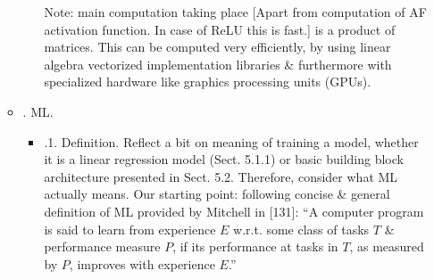 \documentclass{article}
\begin{document}
\begin{itemize}
\begin{itemize}
\begin{itemize}
			Note: main computation taking place [Apart from computation of AF activation function. In case of ReLU this is fast.] is a product of matrices. This can be computed very efficiently, by using linear algebra vectorized implementation libraries \& furthermore with specialized hardware like graphics processing units (GPUs).
		\end{itemize}
		\item {. ML.}
		\begin{itemize}
			\item {.1. Definition.} Reflect a bit on meaning of training a model, whether it is a linear regression model (Sect. 5.1.1) or basic building block architecture presented in Sect. 5.2. Therefore, consider what ML actually means. Our starting point: following concise \& general definition of ML provided by {\sc Mitchell} in [131]: ``A computer program is said to learn from experience $E$ w.r.t. some class of tasks $T$ \& performance measure $P$, if its performance at tasks in $T$, as measured by $P$, improves with experience $E$.''


\end{itemize}
\end{itemize}
\end{itemize}
\end{document}

